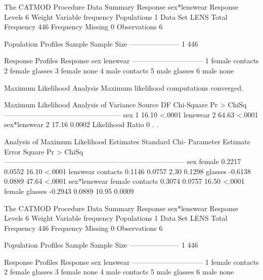 \documentclass{article}
\begin{document}
\begin{Woutput}
The CATMOD Procedure
                      Data Summary
Response           sex*lenswear     Response Levels    6
Weight Variable    frequency        Populations        1
Data Set           LENS             Total Frequency  446
Frequency Missing  0                Observations       6

 Population Profiles
Sample    Sample Size
---------------------
    1             446

      Response Profiles
Response    sex       lenswear
------------------------------
    1       female    contacts
    2       female    glasses
    3       female    none
    4       male      contacts
    5       male      glasses
    6       male      none

                   Maximum Likelihood Analysis
           Maximum likelihood computations converged.

     Maximum Likelihood Analysis of Variance
Source               DF   Chi-Square    Pr > ChiSq
--------------------------------------------------
sex                   1        16.10        <.0001
lenswear              2        64.63        <.0001
sex*lenswear          2        17.16        0.0002
Likelihood Ratio      0          .           .

                  Analysis of Maximum Likelihood Estimates
                                           Standard        Chi-
Parameter                       Estimate      Error      Square    Pr > ChiSq
-----------------------------------------------------------------------------
sex          female               0.2217     0.0552       16.10        <.0001
lenswear     contacts             0.1146     0.0757        2.30        0.1298
             glasses             -0.6138     0.0889       47.64        <.0001
sex*lenswear female contacts      0.3074     0.0757       16.50        <.0001
             female glasses      -0.2943     0.0889       10.95        0.0009

The CATMOD Procedure
                      Data Summary
Response           sex*lenswear     Response Levels    6
Weight Variable    frequency        Populations        1
Data Set           LENS             Total Frequency  446
Frequency Missing  0                Observations       6

 Population Profiles
Sample    Sample Size
---------------------
    1             446

      Response Profiles
Response    sex       lenswear
------------------------------
    1       female    contacts
    2       female    glasses
    3       female    none
    4       male      contacts
    5       male      glasses
    6       male      none


\end{Woutput}
\end{document}
